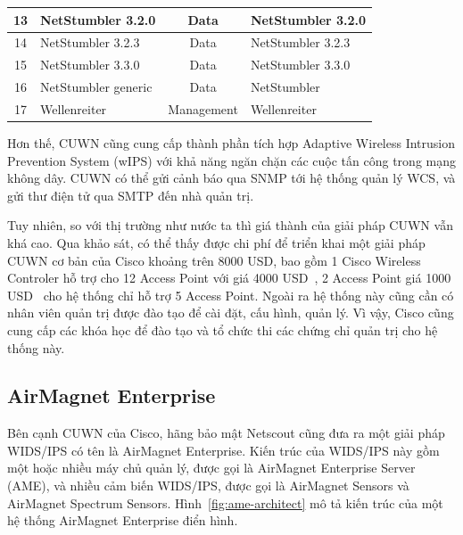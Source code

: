 \begin{table}[h!]
\begin{tabular}{|c|p{3.9cm}|c|p{6.8cm}|}
13                                 & NetStumbler 3.2.0     & Data                & NetStumbler 3.2.0                              \\ \hline
14                                 & NetStumbler 3.2.3     & Data                & NetStumbler 3.2.3                              \\ \hline
15                                 & NetStumbler 3.3.0     & Data                & NetStumbler 3.3.0                              \\ \hline
16                                 & NetStumbler generic   & Data                & NetStumbler                                    \\ \hline
17                                 & Wellenreiter          & Management          & Wellenreiter                                   \\ \hline
\end{tabular}
\end{table}

Hơn thế, CUWN cũng cung cấp thành phần tích hợp Adaptive Wireless Intrusion Prevention System (wIPS) với khả năng ngăn chặn các cuộc tấn công trong mạng không dây. CUWN có thể gửi cảnh báo qua SNMP tới hệ thống quản lý WCS, và gửi thư điện tử qua SMTP đến nhà quản trị.

Tuy nhiên, so với thị trường như nước ta thì giá thành của giải pháp CUWN vẫn khá cao. Qua khảo sát, có thể thấy được chi phí để triển khai một giải pháp CUWN cơ bản của Cisco khoảng trên 8000 USD, bao gồm 1 Cisco Wireless Controler hỗ trợ cho 12 Access Point với giá 4000 USD~\cite{router2017airwlc}, 2 Access Point giá 1000 USD~\cite{router2017airap} cho hệ thống chỉ hỗ trợ 5 Access Point. Ngoài ra hệ thống này cũng cần có nhân viên quản trị được đào tạo để cài đặt, cấu hình, quản lý. Vì vậy, Cisco cũng cung cấp các khóa học để đào tạo và tổ chức thi các chứng chỉ quản trị cho hệ thống này.

\subsection{AirMagnet Enterprise}

Bên cạnh CUWN của Cisco, hãng bảo mật Netscout cũng đưa ra một giải pháp WIDS/IPS có tên là AirMagnet Enterprise. Kiến trúc của WIDS/IPS này gồm một hoặc nhiều máy chủ quản lý, được gọi là AirMagnet Enterprise Server (AME), và nhiều cảm biến WIDS/IPS, được gọi là AirMagnet Sensors và AirMagnet Spectrum Sensors. Hình~\ref{fig:ame-architect} mô tả kiến trúc của một hệ thống AirMagnet Enterprise điển hình.

